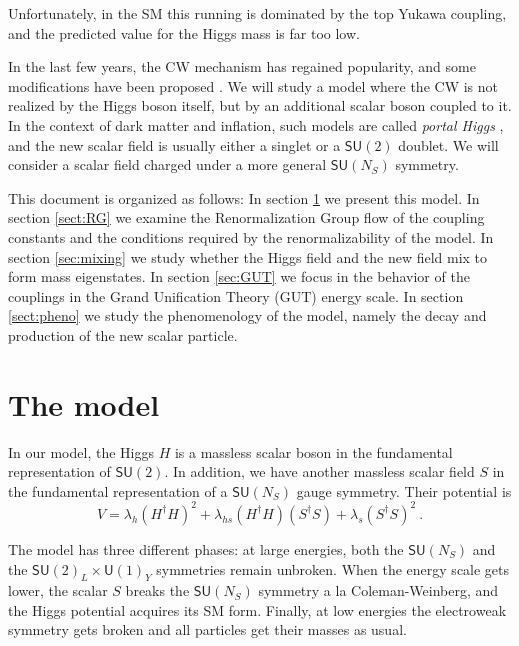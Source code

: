 \documentclass[aps,prd,preprintnumbers,nofootinbibn,twocolumn]{revtex4}
\begin{document}
Unfortunately, in the SM this running is dominated by the top Yukawa coupling, and the predicted value for the Higgs mass is far too low.  

In the last few years, the CW mechanism has regained popularity, and some modifications have been proposed \cite{Dermisek:2013pta, Hill:2014mqa, Antipin:2015kgh}. We will study a model where the CW is not realized by the Higgs boson itself, but by an additional scalar boson coupled to it. In the context of dark matter and inflation, such models are called \textit{portal Higgs} \cite{Patt:2006fw, Englert:2013gz}, and the new scalar field is usually either a singlet or a $\mathsf{SU}(2)$ doublet. We will consider a scalar field charged under a more general $\mathsf{SU}(N_S)$ symmetry.

This document is organized as follows: In section \ref{sect:model} we present this model. In section \ref{sect:RG} we examine the Renormalization Group flow of the coupling constants and the conditions required by the renormalizability of the model. In section \ref{sec:mixing} we study whether the Higgs field and the new field mix to form mass eigenstates. In section \ref{sec:GUT} we focus in the behavior of the couplings in the Grand Unification Theory (GUT) energy scale. In section \ref{sect:pheno} we study the phenomenology of the model, namely the decay and production of the new scalar particle.

\section{The model} \label{sect:model}
In our model, the Higgs $H$ is a massless scalar boson in the fundamental representation of $\mathsf{SU}(2)$. In addition, we have another massless scalar field $S$ in the fundamental representation of a $\mathsf{SU}(N_S)$ gauge symmetry. Their potential is
\begin{equation}\label{eq:CWpotential}
V = \lambda_h (H^\dagger H)^2 + \lambda_{hs} (H^\dagger H) (S^\dagger S) + \lambda_s (S^\dagger S)^2\ .
\end{equation}

The model has three different phases: at large energies, both the $\mathsf{SU}(N_S)$ and the  $\mathsf{SU}(2)_L \times \mathsf{U}(1)_Y$ symmetries remain unbroken. When the energy scale gets lower, the scalar $S$ breaks the $\mathsf{SU}(N_S)$ symmetry a la Coleman-Weinberg, and the Higgs potential acquires its SM form. Finally, at low energies the electroweak symmetry gets broken and all particles get their masses as usual.
\end{document}
